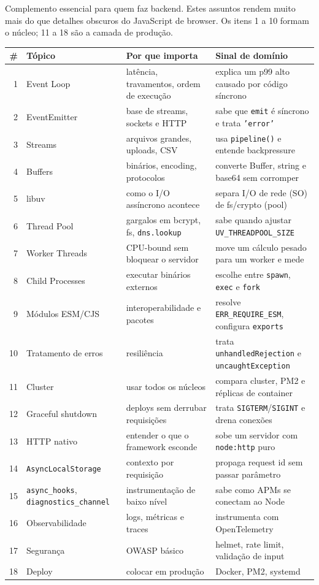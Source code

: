 \documentclass[12pt,a4paper,oneside]{book}
\newcommand{\code}[1]{\texttt{#1}}
\begin{document}
Complemento essencial para quem faz backend. Estes assuntos rendem muito mais do que detalhes obscuros do JavaScript de browser. Os itens 1 a 10 formam o núcleo; 11 a 18 são a camada de produção.

{\small
\begin{tabularx}{\textwidth}{@{}rlXX@{}}
\toprule
\# & \textbf{Tópico} & \textbf{Por que importa} & \textbf{Sinal de domínio} \\
\midrule
1 & Event Loop & latência, travamentos, ordem de execução & explica um p99 alto causado por código síncrono \\
2 & EventEmitter & base de streams, sockets e HTTP & sabe que \code{emit} é síncrono e trata \code{'error'} \\
3 & Streams & arquivos grandes, uploads, CSV & usa \code{pipeline()} e entende backpressure \\
4 & Buffers & binários, encoding, protocolos & converte Buffer, string e base64 sem corromper \\
5 & libuv & como o I/O assíncrono acontece & separa I/O de rede (SO) de fs/crypto (pool) \\
6 & Thread Pool & gargalos em bcrypt, fs, \code{dns.lookup} & sabe quando ajustar \code{UV\_THREADPOOL\_SIZE} \\
7 & Worker Threads & CPU-bound sem bloquear o servidor & move um cálculo pesado para um worker e mede \\
8 & Child Processes & executar binários externos & escolhe entre \code{spawn}, \code{exec} e \code{fork} \\
9 & Módulos ESM/CJS & interoperabilidade e pacotes & resolve \code{ERR\_REQUIRE\_ESM}, configura \code{exports} \\
10 & Tratamento de erros & resiliência & trata \code{unhandledRejection} e \code{uncaughtException} \\
\midrule
11 & Cluster & usar todos os núcleos & compara cluster, PM2 e réplicas de container \\
12 & Graceful shutdown & deploys sem derrubar requisições & trata \code{SIGTERM}/\code{SIGINT} e drena conexões \\
13 & HTTP nativo & entender o que o framework esconde & sobe um servidor com \code{node:http} puro \\
14 & \code{AsyncLocalStorage} & contexto por requisição & propaga request id sem passar parâmetro \\
15 & \code{async\_hooks}, \code{diagnostics\_channel} & instrumentação de baixo nível & sabe como APMs se conectam ao Node \\
16 & Observabilidade & logs, métricas e traces & instrumenta com OpenTelemetry \\
17 & Segurança & OWASP básico & helmet, rate limit, validação de input \\
18 & Deploy & colocar em produção & Docker, PM2, systemd \\
\bottomrule
\end{tabularx}
}
\end{document}
